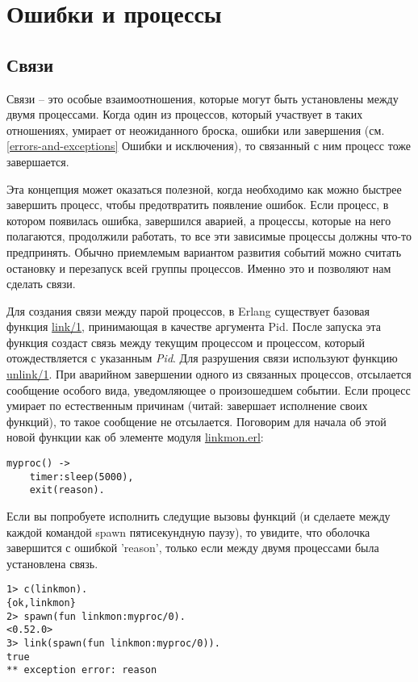 \chapter{Ошибки и процессы}
\label{errors-and-processes}
\section{Связи}
\label{links}
Связи \--- это особые взаимоотношения, которые могут быть установлены между двумя процессами.
Когда один из процессов, который участвует в таких отношениях, умирает от неожиданного броска, ошибки или завершения (см. \ref{errors-and-exceptions} Ошибки и исключения), то связанный с ним процесс тоже завершается.

Эта концепция может оказаться полезной, когда необходимо как можно быстрее завершить процесс, чтобы предотвратить появление ошибок.
Если процесс, в котором появилась ошибка, завершился аварией, а процессы, которые на него полагаются, продолжили работать, то все эти зависимые процессы должны что\--то предпринять.
Обычно приемлемым вариантом развития событий можно считать остановку и перезапуск всей группы процессов.
Именно это и позволяют нам сделать связи.

Для создания связи между парой процессов, в Erlang существует базовая функция \href{http://erldocs.com/R15B/erts/erlang.html\#link/1}{link/1}, принимающая в качестве аргумента Pid.
После запуска эта функция создаст связь между текущим процессом и процессом, который отождествляется с указанным \emph{Pid}.
Для разрушения связи используют функцию \href{http://erldocs.com/R15B/erts/erlang.html\#unlink/1}{unlink/1}.
При аварийном завершении одного из связанных процессов, отсылается сообщение особого вида, уведомляющее о произошедшем событии.
Если процесс умирает по естественным причинам (читай: завершает исполнение своих функций), то такое сообщение не отсылается.
Поговорим для начала об этой новой функции как об элементе модуля \href{http://learnyousomeerlang.com/static/erlang/linkmon.erl}{linkmon.erl}:
\begin{lstlisting}[style=erlang]
myproc() ->
    timer:sleep(5000),
    exit(reason).
\end{lstlisting}

Если вы попробуете исполнить следущие вызовы функций (и сделаете между каждой командой spawn пятисекундную паузу), то увидите, что оболочка завершится с ошибкой 'reason', только если между двумя процессами была установлена связь.
\begin{lstlisting}[style=erlang]
1> c(linkmon).
{ok,linkmon}
2> spawn(fun linkmon:myproc/0).
<0.52.0>
3> link(spawn(fun linkmon:myproc/0)).
true
** exception error: reason
\end{lstlisting}

